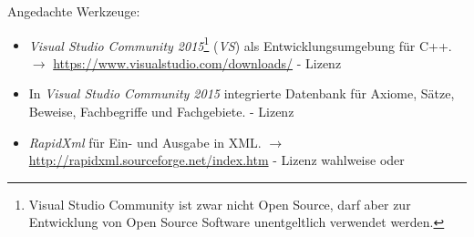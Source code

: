 \documentclass[english,ngerman,parskip=half,headsepline,footsepline]{scrreprt}
\newcounter{Enumi}
\begin{document}
	Angedachte Werkzeuge:
	\begin{itemize}
		\setcounter{enumi}{\value{Enumi}}
		
		\item\label{Werkzeug:VSC}\emph{Visual Studio Community 2015}\footnote{ Visual Studio Community ist zwar nicht Open Source, darf aber zur Entwicklung von Open Source Software unentgeltlich verwendet werden.} (\emph{VS}) als Entwicklungsumgebung für C++. $\rightarrow$ \url{https://www.visualstudio.com/downloads/} - Lizenz \cite{EULA}
		
		\item\label{Werkzeug:VSCDB}In \emph{Visual Studio Community 2015} integrierte Datenbank für Axiome, Sätze, Beweise, Fachbegriffe und Fachgebiete. - Lizenz \cite{EULA}
		
		\item\label{Werkzeug:RapidXml}\emph{RapidXml} für Ein- und Ausgabe in XML. $\rightarrow$ \url{http://rapidxml.sourceforge.net/index.htm} - Lizenz wahlweise \cite{BSLi} oder \cite{MIT}
		
	\end{itemize}
	
\end{document}
